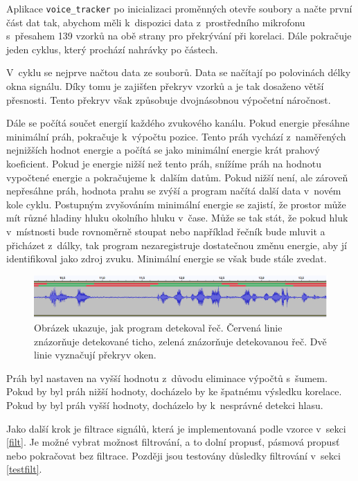 Aplikace \texttt{voice\_tracker} po inicializaci proměnných otevře soubory a načte první část dat tak, abychom měli k~dispozici data z~prostředního mikrofonu s~přesahem 139 vzorků na obě strany pro překrývání při korelaci. Dále pokračuje jeden cyklus, který prochází nahrávky po částech.

V~cyklu se nejprve načtou data ze souborů. Data se načítají po polovinách délky okna signálu. Díky tomu je zajišťen překryv vzorků a je tak dosaženo větší přesnosti. Tento překryv však způsobuje dvojnásobnou výpočetní náročnost.

Dále se počítá součet energií každého zvukového kanálu. Pokud energie přesáhne minimální práh, pokračuje k~výpočtu pozice. Tento práh vychází z~naměřených nejnižších hodnot energie a počítá se jako minimální energie krát prahový koeficient. Pokud je energie nižší než tento práh, snížíme práh na hodnotu vypočtené energie a pokračujeme k~dalším datům. Pokud nižší není, ale zároveň nepřesáhne práh, hodnota prahu se zvýší a program načítá další data v~novém kole cyklu. Postupným zvyšováním minimální energie se zajistí, že prostor může mít různé hladiny hluku okolního hluku v~čase. Může se tak stát, že pokud hluk v~místnosti bude rovnoměrně stoupat nebo například řečník bude mluvit a přicházet z~dálky, tak program nezaregistruje dostatečnou změnu energie, aby jí identifikoval jako zdroj zvuku. Minimální energie se však bude stále zvedat.

\begin{figure}[hbt]
	\centering
	\includegraphics[width=1\textwidth]{obrazky-figures/detekce_hlasu.png}
	\caption{Obrázek ukazuje, jak program detekoval řeč. Červená linie znázorňuje detekované ticho, zelená znázorňuje detekovanou řeč. Dvě linie vyznačují překryv oken.}
	\label{pic:detekce_hlasu}
\end{figure}

Práh byl nastaven na vyšší hodnotu z~důvodu eliminace výpočtů s~šumem. Pokud by byl práh nižší hodnoty, docházelo by ke špatnému výsledku korelace. Pokud by byl práh vyšší hodnoty, docházelo by k~nesprávné detekci hlasu.

Jako další krok je filtrace signálů, která je implementovaná podle vzorce v~sekci \ref{filt}. Je možné vybrat možnost filtrování, a to dolní propusť, pásmová propusť nebo pokračovat bez filtrace. Později jsou testovány důsledky filtrování v~sekci \ref{testfilt}.

